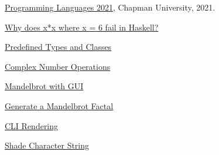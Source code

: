 \documentclass{article}
\begin{document}
\begin{thebibliography}{99}
 \href{https://github.com/alexhkurz/programming-languages-2021/blob/main/README.md}{Programming Languages 2021}, Chapman University, 2021.

 \href{https://stackoverflow.com/questions/59462192/why-does-xx-where-x-6-fail-in-haskell}{Why does x*x where x = 6 fail in Haskell?}

 \href{https://www.haskell.org/onlinereport/haskell2010/haskellch6.html#x13-1270011}{Predefined Types and Classes}

 \href{https://www.dummies.com/article/academics-the-arts/math/pre-calculus/how-to-perform-operations-with-complex-numbers-167803}{Complex Number Operations}

 \href{https://typeclasses.com/art/mandelbrot}{Mandelbrot with GUI}

 \href{https://codegolf.stackexchange.com/questions/3105/generate-a-mandelbrot-fractal}{Generate a Mandelbrot Factal}

 \href{http://www.cs.columbia.edu/~sedwards/classes/2019/4995-fall/reports/mandelbrot.pdf}{CLI Rendering}

 \href{http://mewbies.com/geek_fun_files/ascii/ascii_art_light_scale_and_gray_scale_chart.html}{Shade Character String}
\end{thebibliography}
\end{document}
